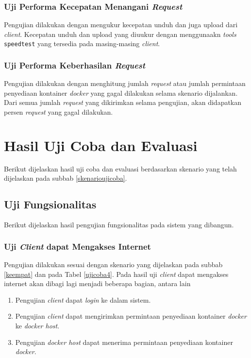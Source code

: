 \subsubsection{Uji Performa Kecepatan Menangani \textit{Request}}
Pengujian dilakukan dengan mengukur kecepatan unduh dan juga upload dari \textit{client}. Kecepatan unduh dan upload yang diuukur dengan menggunaakn \textit{tools} \texttt{speedtest} yang tersedia pada masing-masing \textit{client}.

\subsubsection{Uji Performa Keberhasilan \textit{Request}}
Pengujian dilakukan dengan menghitung jumlah \textit{request} atau jumlah permintaan penyediaan kontainer \textit{docker} yang gagal dilakukan selama skenario dijalankan. Dari semua jumlah \textit{request} yang dikirimkan selama pengujian, akan didapatkan persen \textit{request} yang gagal dilakukan.

\section{Hasil Uji Coba dan Evaluasi}
Berikut dijelaskan hasil uji coba dan evaluasi berdasarkan skenario yang telah dijelaskan pada subbab \ref{skenarioujicoba}.

\subsection{Uji Fungsionalitas}
Berikut dijelaskan hasil pengujian fungsionalitas pada sistem yang dibangun.

\subsubsection{Uji \textit{Client} dapat Mengakses Internet}
Pengujian dilakukan sesuai dengan skenario yang dijelaskan pada subbab \ref{keempat} dan pada Tabel \ref{ujicoba4}. Pada hasil uji \textit{client} dapat mengakses internet akan dibagi lagi menjadi beberapa bagian, antara lain
\begin{enumerate}
	\item Pengujian \textit{client} dapat \textit{login} ke dalam sistem.
	\item Pengujian \textit{client} dapat mengirimkan permintaan penyediaan kontainer \textit{docker} ke \textit{docker host}.
	\item Pengujian \textit{docker host} dapat menerima permintaan penyediaan kontainer \textit{docker}.
\end{enumerate}

